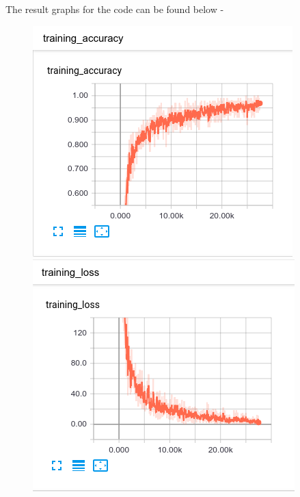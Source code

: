 The result graphs for the code can be found below - \\
\begin{figure}[h]
\centering
\begin{minipage}{.5\textwidth}
  \centering
  \includegraphics[width=.99\linewidth]{1.png}
\end{minipage}%
\begin{minipage}{.5\textwidth}
  \centering
  \includegraphics[width=.99\linewidth]{2.png}
\end{minipage}
\end{figure}

